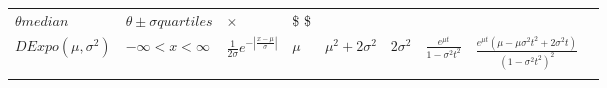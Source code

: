 \documentclass[]{tufte-book}
\begin{document}
\begin{longtable}[]{@{}lllllllll@{}}
\begin{minipage}[t]{0.08\columnwidth}
\(\theta{median}\)\strut
\end{minipage} & \begin{minipage}[t]{0.08\columnwidth}\raggedright
\(\theta\pm\sigma{quartiles}\)\strut
\end{minipage} & \begin{minipage}[t]{0.08\columnwidth}\raggedright
\(\times\)\strut
\end{minipage} & \begin{minipage}[t]{0.08\columnwidth}\raggedright
\$ \$\strut
\end{minipage} & \begin{minipage}[t]{0.08\columnwidth}\raggedright
\strut
\end{minipage} & \begin{minipage}[t]{0.08\columnwidth}\raggedright
\strut
\end{minipage}\tabularnewline
\begin{minipage}[t]{0.08\columnwidth}\raggedright
\(DExpo(\mu,\sigma^2)\)\strut
\end{minipage} & \begin{minipage}[t]{0.08\columnwidth}\raggedright
\(-\infty<x<\infty\)\strut
\end{minipage} & \begin{minipage}[t]{0.08\columnwidth}\raggedright
\(\frac{1}{2\sigma} e^{-|\frac{x-\mu}{\sigma}|}\)\strut
\end{minipage} & \begin{minipage}[t]{0.08\columnwidth}\raggedright
\(\mu\)\strut
\end{minipage} & \begin{minipage}[t]{0.08\columnwidth}\raggedright
\(\mu^2+2\sigma^2\)\strut
\end{minipage} & \begin{minipage}[t]{0.08\columnwidth}\raggedright
\(2\sigma^2\)\strut
\end{minipage} & \begin{minipage}[t]{0.08\columnwidth}\raggedright
\(\frac{e^{\mu t}}{1-\sigma^2t^2}\)\strut
\end{minipage} & \begin{minipage}[t]{0.08\columnwidth}\raggedright
\(\frac{e^{\mu t}(\mu-\mu\sigma^2t^2+2\sigma^2t)}{(1-\sigma^2t^2)^2}\)\strut
\end{minipage} & \begin{minipage}[t]{0.08\columnwidth}\raggedright
\strut
\end{minipage}\tabularnewline
\begin{minipage}[t]{0.08\columnwidth}\raggedright

\end{minipage}
\end{longtable}
\end{document}
